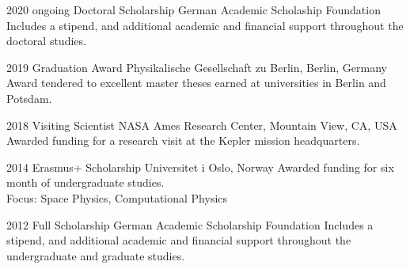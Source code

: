 \documentclass[]{k-cv} %
\begin{document}
\begin{entrylist}
\entry
{2020 \to ongoing}
{Doctoral Scholarship}
{German Academic Scholaship Foundation}
{Includes a stipend, and additional academic and financial support throughout the doctoral studies.}

\entry
{2019}
{Graduation Award}
{Physikalische Gesellschaft zu Berlin, Berlin, Germany}
{Award tendered to excellent master theses earned at universities in Berlin and Potsdam.}


\entry
{2018}
{Visiting Scientist}
{NASA Ames Research Center, Mountain View, CA, USA}
{Awarded funding for a research visit at the Kepler mission headquarters.}


\entry
{2014}
{Erasmus+ Scholarship}
{Universitet i Oslo, Norway}
{Awarded funding for six month of undergraduate studies.\\
Focus: Space Physics, Computational Physics}

\entry
{2012 }
{Full Scholarship}
{German Academic Scholarship Foundation}
{Includes a stipend, and additional academic and financial support throughout the undergraduate and graduate studies.}

\end{entrylist}





\end{document}
